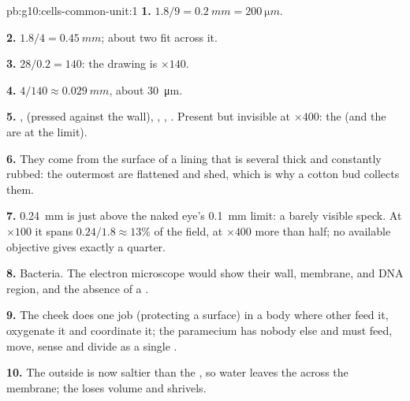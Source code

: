 \begin{solution}{pb:g10:cells-common-unit:1}
\textbf{1.} $1.8/9 = \qty{0.2}{mm} = \qty{200}{\micro m}$.

\textbf{2.} $1.8/4 = \qty{0.45}{mm}$; about two  fit across it.

\textbf{3.} $28/0.2 = 140$: the drawing is $\times 140$.

\textbf{4.} $4/140 \approx \qty{0.029}{mm}$, about \qty{30}{\micro m}.

\textbf{5.} ,  (pressed against the wall),
, , . Present but invisible at $\times 400$:
the  (and the  are at the limit).

\textbf{6.} They come from the surface of a lining that is several
 thick and constantly rubbed: the outermost  are flattened
and shed, which is why a cotton bud collects them.

\textbf{7.} \qty{0.24}{mm} is just above the naked eye's
\qty{0.1}{mm} limit: a barely visible speck. At $\times 100$ it spans
$0.24/1.8 \approx 13\%$ of the field, at $\times 400$ more than half;
no available objective gives exactly a quarter.

\textbf{8.} Bacteria. The electron microscope would show their wall,
membrane,  and DNA region, and the absence of a .

\textbf{9.} The cheek  does one job (protecting a surface) in a
body where other  feed it, oxygenate it and coordinate it; the
paramecium has nobody else and must feed, move, sense and divide as a
single .

\textbf{10.} The outside is now saltier than the , so water
leaves the  across the membrane; the  loses volume and
shrivels.


\end{solution}
